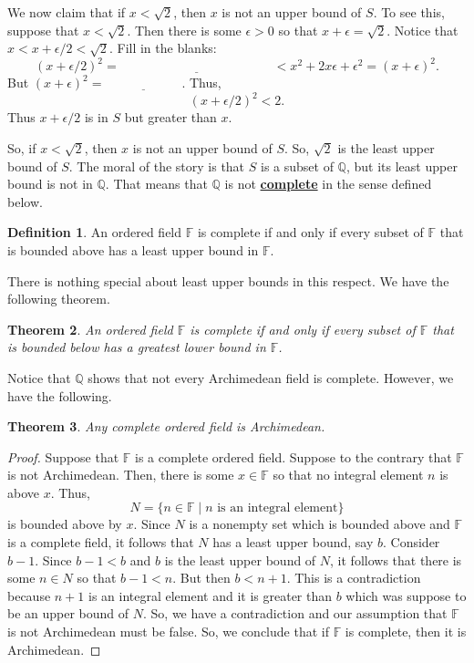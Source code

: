 \documentclass[11pt]{article}
\newenvironment{task}
	{\begin{mdframed}[linecolor=lightgray, linewidth=3pt]\raggedright}
	{\end{mdframed}}
\renewcommand\emph[1]{\underline{\bf{#1}}} %
\newtheorem{theorem}{Theorem}[section]
\theoremstyle{definition}
\newtheorem{definition}[theorem]{Definition}
\begin{document}
\begin{task}
  We now claim that
  if $x < \sqrt{2}$, then $x$ is not an upper bound of $S$. To see this, suppose that $x < \sqrt{2}$. Then there is
  some $\epsilon > 0$ so that $x+\epsilon = \sqrt{2}$. Notice that $x < x + \epsilon/2 < \sqrt{2}$. Fill in the blanks:
  \[ (x + \epsilon/2)^2 = \underline{\hspace{2in}} < x^2 + 2x\epsilon + \epsilon^2 = (x+\epsilon)^2. \]
  But $(x+\epsilon)^2 = \underline{\hspace{1in}}$. Thus,
  \[ (x+\epsilon/2)^2 < 2. \]
  Thus $x+\epsilon/2$ is in $S$ but greater than $x$. 
  
  So, if $x<\sqrt{2}$, then $x$ is not an upper bound of $S$. So, $\sqrt{2}$ is the least upper bound of $S$. The moral of the story is
  that $S$ is a subset of $\mathbb{Q}$, but its least upper bound is not in $\mathbb{Q}$. That means that $\mathbb{Q}$ is not \emph{complete}
  in the sense defined below.
\end{task}

\begin{definition}
  An ordered field $\mathbb{F}$ is complete if and only if every subset of $\mathbb{F}$ that is bounded above has a least upper bound in 
  $\mathbb{F}$.
\end{definition}

There is nothing special about least upper bounds in this respect. We have the following theorem.

\begin{theorem}
  An ordered field $\mathbb{F}$ is complete if and only if every subset of $\mathbb{F}$ that is bounded below has a greatest lower bound
  in $\mathbb{F}$.
  \label{theorem: alternate completeness axiom}
\end{theorem}

Notice that $\mathbb{Q}$ shows that not every Archimedean field is complete. However, we have the following.

\begin{theorem}
  Any complete ordered field is Archimedean.
  \label{theorem: complete implies archimedean}
\end{theorem}
\begin{proof}
  Suppose that $\mathbb{F}$ is a complete ordered field. Suppose to the contrary that $\mathbb{F}$ is not Archimedean. Then, there is
  some $x\in \mathbb{F}$ so that no integral element $n$ is above $x$. Thus,
  \[ N = \{ n \in \mathbb{F} \mid n \text{ is an integral element} \}\]
  is bounded above by $x$. Since $N$ is a nonempty set which is bounded above and $\mathbb{F}$ is a complete field, it follows that
  $N$ has a least upper bound, say $b$. Consider $b-1$. Since $b-1 < b$ and $b$ is the least upper bound of $N$, it follows that there is
  some $n \in N$ so that $b-1 < n$. But then $b < n+1$. This is a contradiction because $n+1$ is an integral element and it is greater
  than $b$ which was suppose to be an upper bound of $N$. So, we have a contradiction and our assumption that $\mathbb{F}$ is not
  Archimedean must be false. So, we conclude that if $\mathbb{F}$ is complete, then it is Archimedean.
\end{proof}
\end{document}

